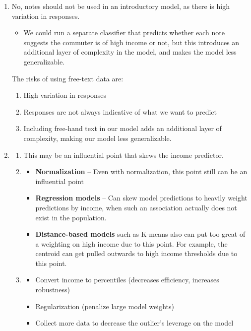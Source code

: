 \documentclass{article}
\begin{document}
\begin{enumerate}
    \item No, notes should not be used in an introductory model, as there is high variation in responses.
    \begin{itemize}
        \item We could run a separate classifier that predicts whether each note suggests the commuter is of high income or not, but this introduces an additional layer of complexity in the model, and makes the model less generalizable.
    \end{itemize}

    The risks of using free-text data are:
    \begin{enumerate}
        \item High variation in responses
        \item Responses are not always indicative of what we want to predict
        \item Including free-hand text in our model adds an additional layer of complexity, making our model less generalizable.
    \end{enumerate}

    \item
    \begin{enumerate}
        \item This may be an influential point that skews the income predictor.

        \item
        \begin{itemize}
            \item \textbf{Normalization} -- Even with normalization, this point still can be an influential point
            \item \textbf{Regression models} -- Can skew model predictions to heavily weight predictions by income, when such an association actually does not exist in the population.
            \item \textbf{Distance-based models} such as K-means also can put too great of a weighting on high income due to this point. For example, the centroid can get pulled outwards to high income thresholds due to this point.
        \end{itemize}

        \item
        \begin{itemize}
            \item Convert income to percentiles (decreases efficiency, increases robustness)
            \item Regularization (penalize large model weights)
            \item Collect more data to decrease the outlier's leverage on the model
        \end{itemize}
    \end{enumerate}
\end{enumerate}
\end{document}

